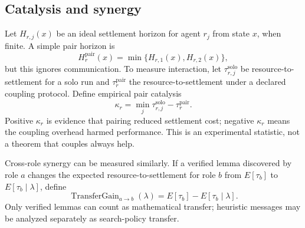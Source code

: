 \documentclass[11pt]{article}
\begin{document}
\subsection{Catalysis and synergy}

Let $H_{r,j}(x)$ be an ideal settlement horizon for agent $r_j$ from state $x$, when finite. A simple pair horizon is
\[
H_r^{\mathrm{pair}}(x)=\min\{H_{r,1}(x),H_{r,2}(x)\},
\]
but this ignores communication. To measure interaction, let $\tau_{r,j}^{\mathrm{solo}}$ be resource-to-settlement for a solo run and $\tau_r^{\mathrm{pair}}$ the resource-to-settlement under a declared coupling protocol. Define empirical pair catalysis
\[
\kappa_r
=
\min_j \tau_{r,j}^{\mathrm{solo}}-\tau_r^{\mathrm{pair}}.
\]
Positive $\kappa_r$ is evidence that pairing reduced settlement cost; negative $\kappa_r$ means the coupling overhead harmed performance. This is an experimental statistic, not a theorem that couples always help.

Cross-role synergy can be measured similarly. If a verified lemma discovered by role $a$ changes the expected resource-to-settlement for role $b$ from $E[\tau_b]$ to $E[\tau_b\mid\lambda]$, define
\[
\operatorname{TransferGain}_{a\to b}(\lambda)
=E[\tau_b]-E[\tau_b\mid\lambda].
\]
Only verified lemmas can count as mathematical transfer; heuristic messages may be analyzed separately as search-policy transfer.
\end{document}

